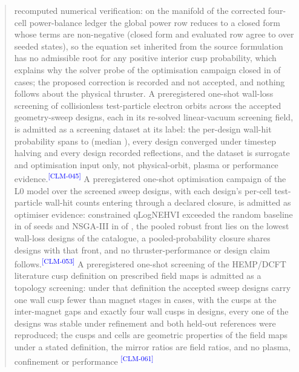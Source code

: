 \documentclass[11pt]{article}
\newcommand{\EvidenceClaim}[2]{#2\textsuperscript{\textcolor{blue}{[#1]}}}
\begin{document}
\begin{abstract}
{recomputed numerical verification: on the manifold of the corrected four-cell
power-balance ledger the global power row reduces to a closed form whose terms
are non-negative (closed form and evaluated row agree to \FccClosedFormRelDiff{}
over \FccClosedFormSamples{} seeded states), so the equation set inherited from
the source formulation has no admissible root for any positive interior cusp
probability, which explains why the solver probe of the optimisation campaign
closed in \FccProbeClosed{} of \FccProbeTotal{} cases; the proposed correction is
recorded and not accepted, and nothing follows about the physical thruster.}
\EvidenceClaim{CLM-045}{A preregistered one-shot wall-loss screening of
\WlgOrbitCount{} collisionless test-particle electron orbits across the
\WlgDesignCount{} accepted geometry-sweep designs, each in its re-solved
linear-vacuum screening field, is admitted as a screening dataset at its label:
the per-design wall-hit probability spans \WlgWallPMin{} to \WlgWallPMax{} (median
\WlgWallPMedian), every design converged under timestep halving and every design
recorded reflections, and the dataset is surrogate and optimisation input only,
not physical-orbit, plasma or performance evidence.}
\EvidenceClaim{CLM-053}{A preregistered one-shot optimisation campaign of the L0
model over the \MdbCatalogueSize{} screened sweep designs, with each design's
per-cell test-particle wall-hit counts entering through a declared closure, is
admitted as optimiser evidence: constrained qLogNEHVI exceeded the random baseline
in \MdbBoBeatsRandomWins{} of \MdbBoBeatsRandomSeeds{} seeds and NSGA-III in
\MdbBoBeatsNsgaWins{} of \MdbBoBeatsNsgaSeeds, the pooled robust front lies on the
\MdbRobustFrontDesignCount{} lowest wall-loss designs of the catalogue, a
pooled-probability closure shares \MdbClTwoShared{} designs with that front, and no
thruster-performance or design claim follows.}
\EvidenceClaim{CLM-061}{A preregistered one-shot screening of the HEMP/DCFT
literature cusp definition on \CtvDesignCount{} prescribed field maps is admitted
as a topology screening: under that definition the \CtvSweepCount{} accepted sweep
designs carry one wall cusp fewer than magnet stages in \CtvSweepNMinusOne{} cases,
with the cusps at the inter-magnet gaps and exactly four wall cusps in
\CtvSweepFourWallCusps{} designs, every one of the \CtvDesignCount{} designs was
stable under refinement and both held-out references were reproduced; the cusps
and cells are geometric properties of the field maps under a stated definition,
the mirror ratios are field ratios, and no plasma, confinement or performance
}
\end{abstract}
\end{document}
